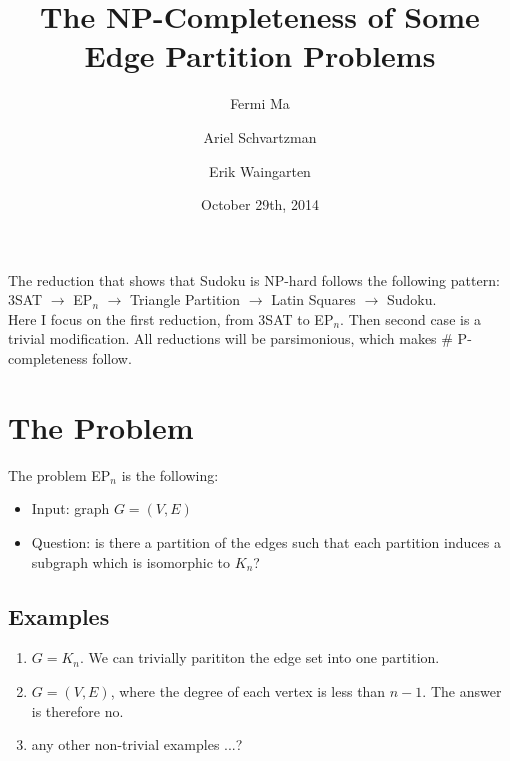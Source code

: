 \documentclass[runningheads,a4paper]{llncs}
\date{October 29th, 2014}							%
\begin{document}
\title{The NP-Completeness of Some Edge Partition Problems}
\titlerunning{}

\author{Fermi Ma \and Ariel Schvartzman \and Erik Waingarten}
%


\maketitle

The reduction that shows that Sudoku is NP-hard follows the following pattern:\\
3SAT $\rightarrow$ EP$_n$ $\rightarrow$ Triangle Partition $\rightarrow$ Latin Squares $\rightarrow$ Sudoku. \\
Here I focus on the first reduction, from 3SAT to EP$_n$. Then second case is a trivial modification. All reductions will be parsimonious, which makes \# P-completeness follow.

\section{The Problem}

The problem EP$_n$ is the following: 
\begin{itemize}
\item Input: graph $G = (V, E)$
\item Question: is there a partition of the edges such that each partition induces a subgraph which is isomorphic to $K_n$?
\end{itemize}

\subsection{Examples}

\begin{enumerate}
\item $G = K_n$. We can trivially parititon the edge set into one partition.
\item $G = (V, E)$, where the degree of each vertex is less than $n-1$. The answer is therefore no.
\item any other non-trivial examples ...?
\end{enumerate}
\end{document}
